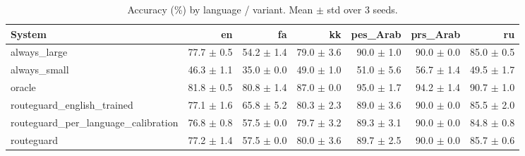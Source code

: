 \begin{table}[t]
\centering
\small
\caption{Accuracy (\%) by language / variant. Mean $\pm$ std over 3 seeds.}
\label{tab:language_breakdown}
\begin{tabular}{lrrrrrr}
\toprule
System & en & fa & kk & pes\_Arab & prs\_Arab & ru \\
\midrule
always\_large & 77.7 $\pm$ 0.5 & 54.2 $\pm$ 1.4 & 79.0 $\pm$ 3.6 & 90.0 $\pm$ 1.0 & 90.0 $\pm$ 0.0 & 85.0 $\pm$ 0.5 \\
always\_small & 46.3 $\pm$ 1.1 & 35.0 $\pm$ 0.0 & 49.0 $\pm$ 1.0 & 51.0 $\pm$ 5.6 & 56.7 $\pm$ 1.4 & 49.5 $\pm$ 1.7 \\
oracle & 81.8 $\pm$ 0.5 & 80.8 $\pm$ 1.4 & 87.0 $\pm$ 0.0 & 95.0 $\pm$ 1.7 & 94.2 $\pm$ 1.4 & 90.7 $\pm$ 1.0 \\
routeguard\_english\_trained & 77.1 $\pm$ 1.6 & 65.8 $\pm$ 5.2 & 80.3 $\pm$ 2.3 & 89.0 $\pm$ 3.6 & 90.0 $\pm$ 0.0 & 85.5 $\pm$ 2.0 \\
routeguard\_per\_language\_calibration & 76.8 $\pm$ 0.8 & 57.5 $\pm$ 0.0 & 79.7 $\pm$ 3.2 & 89.3 $\pm$ 3.1 & 90.0 $\pm$ 0.0 & 84.8 $\pm$ 0.8 \\
routeguard & 77.2 $\pm$ 1.4 & 57.5 $\pm$ 0.0 & 80.0 $\pm$ 3.6 & 89.7 $\pm$ 2.5 & 90.0 $\pm$ 0.0 & 85.7 $\pm$ 0.6 \\
\bottomrule
\end{tabular}
\end{table}
